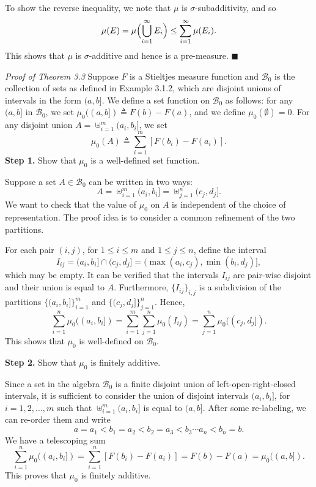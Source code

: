 To show the reverse inequality, we note that $\mu$ is $\sigma$-subadditivity, and so
\[
\mu(E) = \mu\Bigl(\bigcup_{i=1}^{\infty} E_i\Bigr) \le \sum_{i=1}^{\infty} \mu(E_i).
\]
This shows that $\mu$ is $\sigma$-additive and hence is a pre-measure. \hfill $\blacksquare$

\noindent\textit{Proof of Theorem 3.3} Suppose $F$ is a Stieltjes measure function and $\mathcal{B}_0$ is the collection of sets as defined in Example 3.1.2, which are disjoint unions of intervals in the form $(a, b]$. We define a set function on $\mathcal{B}_0$ as follows: for any $(a, b]$ in $\mathcal{B}_0$, we set $\mu_0((a, b]) \triangleq F(b) - F(a)$, and we define $\mu_0(\emptyset) = 0$. For any disjoint union $A = \uplus_{i=1}^{m} (a_i, b_i]$, we set
\[
\mu_0(A) \triangleq \sum_{i=1}^{m} [F(b_i) - F(a_i)].
\]
\textbf{Step 1.} Show that $\mu_0$ is a well-defined set function.

Suppose a set $A \in \mathcal{B}_0$ can be written in two ways:
\[
A = \uplus_{i=1}^m (a_i, b_i] = \uplus_{j=1}^n (c_j, d_j].
\]
We want to check that the value of $\mu_0$ on $A$ is independent of the choice of representation. The proof idea is to consider a common refinement of the two partitions.

For each pair $(i, j)$, for $1 \le i \le m$ and $1 \le j \le n$, define the interval
\[
I_{ij} = (a_i, b_i] \cap (c_j, d_j] = (\max(a_i, c_j), \min(b_i, d_j)],
\]
which may be empty. It can be verified that the intervals $I_{ij}$ are pair-wise disjoint and their union is equal to $A$. Furthermore, $\{I_{ij}\}_{i,j}$ is a subdivision of the partitions $\{(a_i, b_i]\}_{i=1}^m$ and $\{(c_j, d_j]\}_{j=1}^n$. Hence,
\[
\sum_{i=1}^n \mu_0((a_i, b_i]) = \sum_{i=1}^m \sum_{j=1}^n \mu_0(I_{ij}) = \sum_{j=1}^n \mu_0((c_j, d_j]).
\]
This shows that $\mu_0$ is well-defined on $\mathcal{B}_0$.

\textbf{Step 2.} Show that $\mu_0$ is finitely additive.

Since a set in the algebra $\mathcal{B}_0$ is a finite disjoint union of left-open-right-closed intervals, it is sufficient to consider the union of disjoint intervals $(a_i, b_i]$, for $i = 1, 2, \dots, m$ such that $\uplus_{i=1}^m (a_i, b_i]$ is equal to $(a, b]$. After some re-labeling, we can re-order them and write
\[
a = a_1 < b_1 = a_2 < b_2 = a_3 < b_3 \cdots a_n < b_n = b.
\]
We have a telescoping sum
\[
\sum_{i=1}^n \mu_0((a_i, b_i]) = \sum_{i=1}^n [F(b_i) - F(a_i)] = F(b) - F(a) = \mu_0((a, b]).
\]
This proves that $\mu_0$ is finitely additive.

